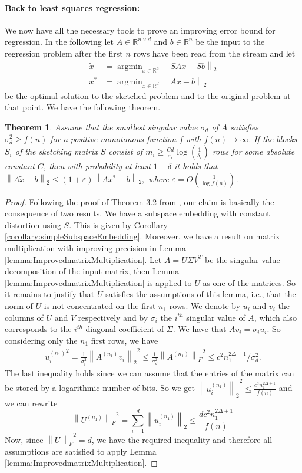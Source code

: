 \documentclass[a4paper,11pt,oneside,english,onecolumn]{article}
\newtheorem{theorem}{Theorem}
\theoremstyle{definition}
\newcommand{\norm}[1]{\ensuremath{\left\| #1\right\|_2}}
\newcommand{\normF}[1]{\ensuremath{\left\| #1\right\|_F}}
\DeclareMathOperator{\argmin}{argmin}
\newcommand{\REAL}{\ensuremath{\mathbb{R}}}
\newcommand{\eps}{\ensuremath{\varepsilon}}
\begin{document}
\paragraph{Back to least squares regression:}
We now have all the necessary tools to prove an improving error bound for regression. In the following let $A\in\REAL^{n\times d}$ and $b\in\REAL^n$ be the input to the regression problem after the first $n$ rows have been read from the stream and let
\begin{align*}
 \tilde x &= \argmin_{x \in \REAL^d} \norm{SAx - Sb}  \\
 x^* &= \argmin_{x \in \REAL^d} \norm{Ax - b}
\end{align*}
be the optimal solution to the sketched problem and to the original problem at that point. We have the following theorem.
\begin{theorem}
\label{th:improveRegression}
Assume that the smallest singular value $\sigma_d$ of $A$ satisfies $\sigma_d^2 \geq f(n)$ for a positive monotonous function $f$ with $f(n) \rightarrow \infty$. If the blocks $S_i$ of the sketching matrix $S$ consist of $m_i \geq \frac{Cd}{\eps_i} \log(\frac{1}{\delta_i})$ rows for some absolute constant $C$, then with probability at least ${1 - \delta}$ it holds that $\norm{A\tilde x - b} \leq (1 + \eps) \norm{Ax^* - b},$
where $\eps = O(\frac{1}{\log f(n)})$.
\end{theorem}

\begin{proof}
Following the proof of Theorem 3.2 from \cite{LinAlgStream}, our claim is basically the consequence of two results. We have a subspace embedding with constant distortion using $S$. This is given by Corollary \ref{corollary:simpleSubspaceEmbedding}. Moreover, we have a result on matrix multiplication with improving precision in Lemma \ref{lemma:ImprovedmatrixMultiplication}. Let $A = U \Sigma V^T$ be the singular value decomposition of the input matrix, then Lemma \ref{lemma:ImprovedmatrixMultiplication} is applied to $U$ as one of the matrices. So it remains to justify that $U$ satisfies the assumptions of this lemma, i.e., that the norm of $U$ is not concentrated on the first $n_1$ rows. 
We denote by $u_i$ and $v_i$ the columns of $U$ and $V$ respectively and by $\sigma_i$ the $i^{th}$ singular value of $A$, which also corresponds to the $i^{th}$ diagonal coefficient of $\Sigma$. We have that $A v_i = \sigma_i u_i$. So considering only the $n_1$ first rows, we have \begin{align}
{u_i^{(n_1)}}^2 = \frac{1}{\sigma_i^2} \norm{A^{(n_1)} v_i}^2 \leq \frac{1}{\sigma_d^2} \normF{A^{(n_1)}}^2\leq c^2 n_1^{2 \Delta + 1}/\sigma_d^2. \label{proof:ineqhypmult}
\end{align}
The last inequality holds since we can assume that the entries of the matrix can be stored by a logarithmic number of bits. So we get $\norm{u_i^{(n_1)}}^2 \leq \frac{c^2n_1^{2 \Delta + 1 }}{f(n)}$ and we can rewrite $$\normF{U^{(n_1)}}^2 = \sum_{i=1}^d \norm{u_i^{(n_1)}} \leq \frac{d c^2 n_1^{2 \Delta + 1}}{f(n)}$$
Now, since $\normF{U}^2=d$, we have the required inequality and therefore all assumptions are satisfied to apply Lemma \ref{lemma:ImprovedmatrixMultiplication}.
\end{proof}
\end{document}
